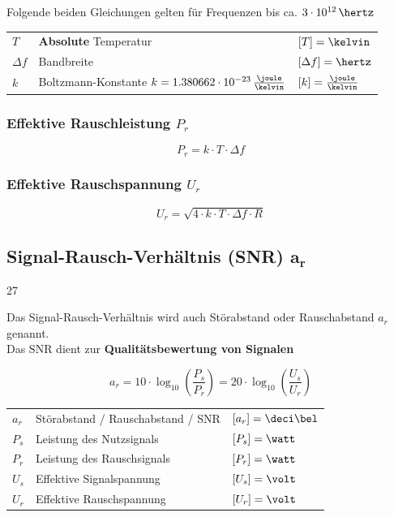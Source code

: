 Folgende beiden Gleichungen gelten für Frequenzen bis ca. $3 \cdot 10^{12} \, \hertz$

\vspace{0.2cm}

\begin{tabular}{lll}
    $T$         & \textbf{Absolute} Temperatur                                                  & $[T] = \kelvin$                   \\
    $\Delta f$  & Bandbreite                                                                    & $[\Delta f] = \hertz$             \\
    $k$         & Boltzmann-Konstante $k = 1.380662 \cdot 10^{-23} \, \frac{\joule}{\kelvin}$   & $[k] = \frac{\joule}{\kelvin}$ 
\end{tabular}


\subsubsection{Effektive Rauschleistung $P_r$}

\vspace{-0.2cm}
$$  \boxed{ P_r = k \cdot T \cdot \Delta f } $$


\subsubsection{Effektive Rauschspannung $U_r$}

\vspace{-0.2cm}
$$  \boxed{ U_r = \sqrt{ 4 \cdot k \cdot T \cdot \Delta f \cdot R } } $$



\subsection[Signal-Rausch-Verhältnis (SNR)]{Signal-Rausch-Verhältnis (SNR) $\bm{a_r}$}{27}

Das Signal-Rausch-Verhältnis wird auch Störabstand oder Rauschabstand $a_r$ genannt. \\
Das SNR dient zur \textbf{Qualitätsbewertung von Signalen} 

$$ \boxed{ a_r = 10 \cdot \log_{10} \left( \frac{P_s}{P_r} \right) = 20 \cdot \log_{10} \left( \frac{U_s}{U_r} \right) } $$

\begin{tabular}{lll}
    $a_r$   & Störabstand / Rauschabstand / SNR     & $[a_r] = \deci \bel$  \\
    $P_s$   & Leistung des Nutzsignals              & $[P_s] = \watt$       \\
    $P_r$   & Leistung des Rauschsignals            & $[P_r] = \watt$       \\
    $U_s$   & Effektive Signalspannung              & $[U_s] = \volt$       \\
    $U_r$   & Effektive Rauschspannung              & $[U_r] = \volt$
\end{tabular}


